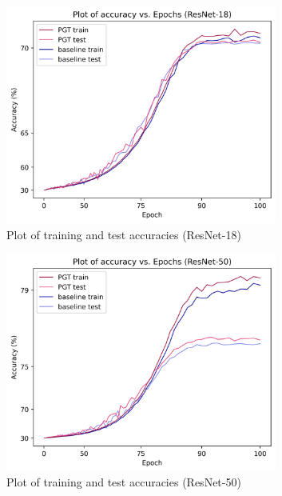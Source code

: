 \documentclass[times,sort&compress]{elsarticle}
\begin{document}
\begin{figure}[!t]
\centering
\begin{subfigure}{.33\textwidth}
\centering
\includegraphics[width=0.98\textwidth]{acc_vs_epoch_r18}
\caption{Plot of training and test accuracies (ResNet-18)}
\end{subfigure}%
\begin{subfigure}{.33\textwidth}
\centering
\includegraphics[width=0.98\textwidth]{acc_vs_epoch_r50}
\caption{Plot of training and test accuracies (ResNet-50)}
\end{subfigure}%
\begin{subfigure}{.33\textwidth}

\end{subfigure}
\end{figure}
\end{document}
